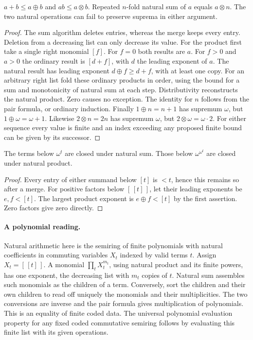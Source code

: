 \begin{proposition}
$a+b\le a\oplus b$ and $ab\le a\otimes b$. Repeated $n$-fold natural sum of $a$ equals $a\otimes n$. The two natural operations can fail to preserve suprema in either argument.
\end{proposition}
\begin{proof}
The sum algorithm deletes entries, whereas the merge keeps every entry. Deletion from a decreasing list can only decrease its value. For the product first take a single right monomial $[f]$. For $f=0$ both results are $a$. For $f>0$ and $a>0$ the ordinary result is $[d+f]$, with $d$ the leading exponent of $a$. The natural result has leading exponent $d\oplus f\ge d+f$, with at least one copy. For an arbitrary right list fold these ordinary products in order, using the bound for a sum and monotonicity of natural sum at each step. Distributivity reconstructs the natural product. Zero causes no exception. The identity for $n$ follows from the pair formula, or ordinary induction. Finally $1\oplus n=n+1$ has supremum $\omega$, but $1\oplus\omega=\omega+1$. Likewise $2\otimes n=2n$ has supremum $\omega$, but $2\otimes\omega=\omega\cdot 2$. For either sequence every value is finite and an index exceeding any proposed finite bound can be given by its successor.
\end{proof}

\begin{corollary}
The terms below $\omega^t$ are closed under natural sum. Those below $\omega^{\omega^t}$ are closed under natural product.
\end{corollary}
\begin{proof}
Every entry of either summand below $[t]$ is $<t$, hence this remains so after a merge. For positive factors below $[\,[t]\,]$, let their leading exponents be $e,f<[t]$. The largest product exponent is $e\oplus f<[t]$ by the first assertion. Zero factors give zero directly.
\end{proof}

\paragraph{A polynomial reading.}
Natural arithmetic here is the semiring of finite polynomials with natural coefficients in commuting variables $X_t$ indexed by valid terms $t$. Assign $X_t=[\,[t]\,]$. A monomial $\prod_t X_t^{m_t}$, using natural product and its finite powers, has one exponent, the decreasing list with $m_t$ copies of $t$. Natural sum assembles such monomials as the children of a term. Conversely, sort the children and their own children to read off uniquely the monomials and their multiplicities. The two conversions are inverse and the pair formula gives multiplication of polynomials. This is an equality of finite coded data. The universal polynomial evaluation property for any fixed coded commutative semiring follows by evaluating this finite list with its given operations.

